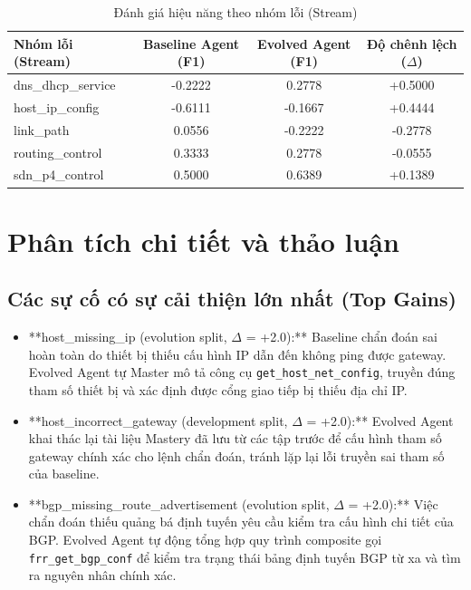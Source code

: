 \begin{table}[htbp]
\centering
\caption{Đánh giá hiệu năng theo nhóm lỗi (Stream)}
\label{tab:results_by_stream}
\begin{tabular}{|l|c|c|c|}
\hline
\textbf{Nhóm lỗi (Stream)} & \textbf{Baseline Agent (F1)} & \textbf{Evolved Agent (F1)} & \textbf{Độ chênh lệch ($\Delta$)} \\ \hline
dns\_dhcp\_service & -0.2222 & 0.2778 & +0.5000 \\ \hline
host\_ip\_config & -0.6111 & -0.1667 & +0.4444 \\ \hline
link\_path & 0.0556 & -0.2222 & -0.2778 \\ \hline
routing\_control & 0.3333 & 0.2778 & -0.0555 \\ \hline
sdn\_p4\_control & 0.5000 & 0.6389 & +0.1389 \\ \hline
\end{tabular}
\end{table}

\section{Phân tích chi tiết và thảo luận}
\label{sec:discussion}

\subsection{Các sự cố có sự cải thiện lớn nhất (Top Gains)}
\begin{itemize}
    \item **host\_missing\_ip (evolution split, $\Delta$ = +2.0):** Baseline chẩn đoán sai hoàn toàn do thiết bị thiếu cấu hình IP dẫn đến không ping được gateway. Evolved Agent tự Master mô tả công cụ \texttt{get\_host\_net\_config}, truyền đúng tham số thiết bị và xác định được cổng giao tiếp bị thiếu địa chỉ IP.
    \item **host\_incorrect\_gateway (development split, $\Delta$ = +2.0):** Evolved Agent khai thác lại tài liệu Mastery đã lưu từ các tập trước để cấu hình tham số gateway chính xác cho lệnh chẩn đoán, tránh lặp lại lỗi truyền sai tham số của baseline.
    \item **bgp\_missing\_route\_advertisement (evolution split, $\Delta$ = +2.0):** Việc chẩn đoán thiếu quảng bá định tuyến yêu cầu kiểm tra cấu hình chi tiết của BGP. Evolved Agent tự động tổng hợp quy trình composite gọi \texttt{frr\_get\_bgp\_conf} để kiểm tra trạng thái bảng định tuyến BGP từ xa và tìm ra nguyên nhân chính xác.
\end{itemize}

